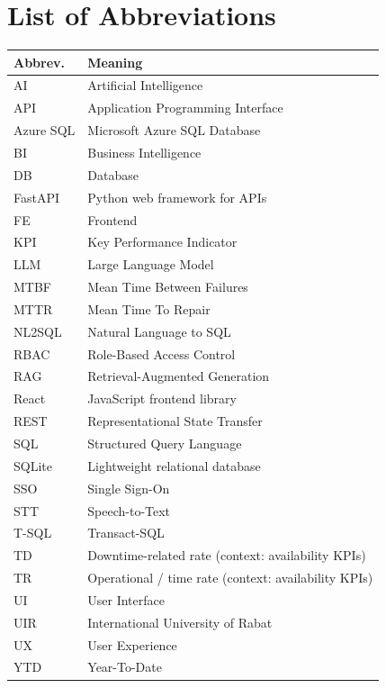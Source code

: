 \chapter*{List of Abbreviations}
\begin{longtable}{@{}p{3.2cm}p{11cm}@{}}
\toprule
\textbf{Abbrev.} & \textbf{Meaning} \\
\midrule
\endhead
AI & Artificial Intelligence \\
API & Application Programming Interface \\
Azure SQL & Microsoft Azure SQL Database \\
BI & Business Intelligence \\
DB & Database \\
FastAPI & Python web framework for APIs \\
FE & Frontend \\
KPI & Key Performance Indicator \\
LLM & Large Language Model \\
MTBF & Mean Time Between Failures \\
MTTR & Mean Time To Repair \\
NL2SQL & Natural Language to SQL \\
RBAC & Role-Based Access Control \\
RAG & Retrieval-Augmented Generation \\
React & JavaScript frontend library \\
REST & Representational State Transfer \\
SQL & Structured Query Language \\
SQLite & Lightweight relational database \\
SSO & Single Sign-On \\
STT & Speech-to-Text \\
T-SQL & Transact-SQL \\
TD & Downtime-related rate (context: availability KPIs) \\
TR & Operational / time rate (context: availability KPIs) \\
UI & User Interface \\
UIR & International University of Rabat \\
UX & User Experience \\
YTD & Year-To-Date \\
\bottomrule
\end{longtable}
